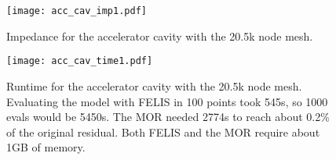 \begin{figure}[h]
	\centering
	\texttt{[image: acc\_cav\_imp1.pdf]}
	\caption{Impedance for the accelerator cavity with the 20.5k node mesh.}
	\label{ }
\end{figure}

\begin{figure}[h]
	\centering
	\texttt{[image: acc\_cav\_time1.pdf]}
	\caption{Runtime for the accelerator cavity with the 20.5k node mesh. Evaluating the model with FELIS in 100 points took 545s, so 1000 evals would be 5450s. The MOR needed 2774s to reach about 0.2\% of the original residual. Both FELIS and the MOR require about 1GB of memory.}
	\label{ }
\end{figure}

































